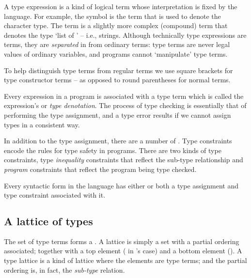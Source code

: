 A type expression is a kind of logical term whose interpretation is fixed by the \go language. For example, the symbol  is the term that is used to denote the character type. The term  is a slightly more complex (compound) term that denotes the type `list of ' -- i.e., strings. Although technically type expressions are terms, they are \emph{separated} in \go from ordinary terms: type terms are never legal values of ordinary variables, and programs cannot `manipulate' type terms.

\begin{aside}
To help distinguish type terms from regular terms we use square brackets for type constructor terms -- as opposed to round parentheses for normal terms.
\end{aside}

Every expression in a \go program is associated with a type term which is called the expression's  or \emph{type denotation}. The process of type checking is essentially that of performing the type assignment, and a type error results if we cannot assign types in a consistent way.

In addition to the type assignment, there are a number of . Type constraints encode the rules for type safety in programs. There are two kinds of type constraints, type \emph{inequality} constraints that reflect the sub-type relationship and \emph{program} constraints that reflect the program being type checked.

Every syntactic form in the \go language has either or both a type assignment and type constraint associated with it.

\subsection{A lattice of types}
The set of type terms forms a . A lattice is simply a set with a partial ordering associated; together with a top element ( in \go's case) and a bottom element (). A type lattice is a kind of lattice where the elements are type terms; and the partial ordering is, in fact, the \emph{sub-type} relation. 

